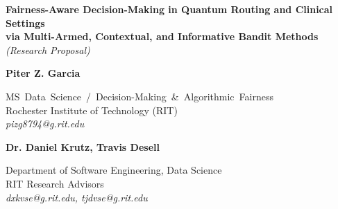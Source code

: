 \documentclass[11pt]{article}
\begin{document}
\pagestyle{empty}

\noindent
\begin{center}
{\large\bf Fairness-Aware Decision-Making in Quantum Routing and Clinical Settings\\ via Multi-Armed, Contextual, and Informative Bandit Methods}\\[0.2em]
{\large\textit{(Research Proposal)}}
\end{center}

\begin{center}
\begin{minipage}{0.48\linewidth}
\begin{center}
{\bf Piter Z. Garcia}\\
\begin{small}
{\footnotesize\mbox{MS Data Science / Decision-Making \& Algorithmic~Fairness}}\\
Rochester Institute of Technology (RIT)\\
{\it pizg8794@g.rit.edu}
\end{small}
\end{center}
\end{minipage}
\begin{minipage}{0.48\linewidth}
\begin{center}
{\bf Dr. Daniel Krutz, Travis Desell}\\
\begin{small}
Department of Software Engineering, Data Science\\
RIT Research Advisors\\
{\it dxkvse@g.rit.edu, tjdvse@g.rit.edu}
\end{small}
\end{center}
\end{minipage}
\end{center}

\noindent
\end{document}
